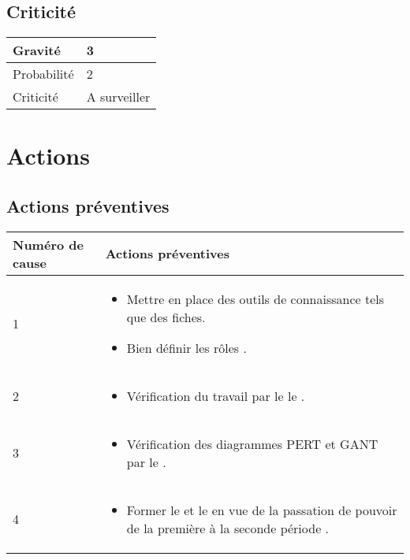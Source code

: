 \subsection*{Criticité}

\begin{table}[H]
\centering
	\begin{tabularx}{16.8cm}{|>{\columncolor{gray!40}}X|X|}
	\hline
	Gravité & 3\\
	\hline
	Probabilité & 2\\
	\hline
	Criticité & A surveiller\\
	\hline
	\end{tabularx}
\end{table}
\newpage

\section*{Actions}
\subsection*{Actions préventives}

\centering
	\begin{longtable}{|p{7cm}|p{7cm}|}
	\hline
	\rowcolor{gray!40} Numéro de cause & Actions préventives \\
	\hline
	 1 & \begin{itemize}
	 	\item Mettre en place des outils de connaissance tels que des fiches. 
	 	\item Bien définir les rôles .
	 \end{itemize} \\
	\hline
	2 & \begin{itemize}
		\item Vérification du travail par le le \RD .
	\end{itemize}	 \\
	\hline
	3 & \begin{itemize}
		\item Vérification des diagrammes PERT et GANT par le \CPA .
	\end{itemize} \\
	\hline
	4 & \begin{itemize}
		\item Former le \CPA{} et le \RQA{} en vue de la passation de pouvoir de la première à la seconde période . 
	\end{itemize} \\
	\hline
	
	\end{longtable}


